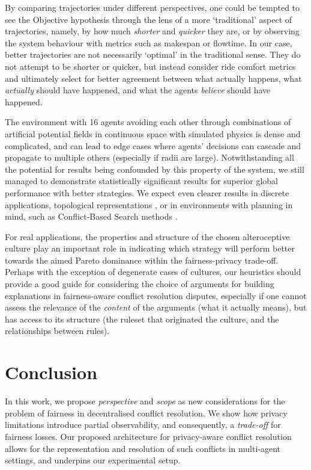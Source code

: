 \documentclass[acmsmall]{custom-arxiv}  %
\begin{document}
By comparing trajectories under different perspectives, one could be tempted to see the Objective hypothesis through the lens of a more `traditional' aspect of trajectories, namely, by how much \textit{shorter} and \textit{quicker} they are, or by observing the system behaviour with metrics such as makespan or flowtime. In our case, better trajectories are not necessarily `optimal' in the traditional sense. They do not attempt to be shorter or quicker, but instead consider ride comfort metrics and ultimately select for better agreement between what actually happens, what \textit{actually} should have happened, and what the agents \textit{believe} should have happened.

The environment with 16 agents avoiding each other through combinations of artificial potential fields in continuous space with simulated physics is dense and complicated, and can lead to edge cases where agents' decisions can cascade and propagate to multiple others (especially if radii are large). Notwithstanding all the potential for results being confounded by this property of the system, we still managed to demonstrate statistically significant results for superior global performance with better strategies. We expect even clearer results in discrete applications, topological representations \citep{Bhattacharya2012TopologicalPlanning}, or in environments with planning in mind, such as Conflict-Based Search methods \citep{Sharon2015Conflict-basedPathfinding}.

For real applications, the properties and structure of the chosen alteroceptive culture play an important role in indicating which strategy will perform better towards the aimed Pareto dominance within the fairness-privacy trade-off. Perhaps with the exception of degenerate cases of cultures, our heuristics should provide a good guide for considering the choice of arguments for building explanations in fairness-aware conflict resolution disputes, especially if one cannot assess the relevance of the \textit{content} of the arguments (what it actually means), but has access to its structure (the ruleset that originated the culture, and the relationships between rules).


\section{Conclusion}

In this work, we propose \textit{perspective} and \textit{scope} as new considerations for the problem of fairness in decentralised conflict resolution. We show how privacy limitations introduce partial observability, and consequently, a \textit{trade-off} for fairness losses. Our proposed architecture for privacy-aware conflict resolution allows for the representation and resolution of such conflicts in multi-agent settings, and underpins our experimental setup.
\end{document}
